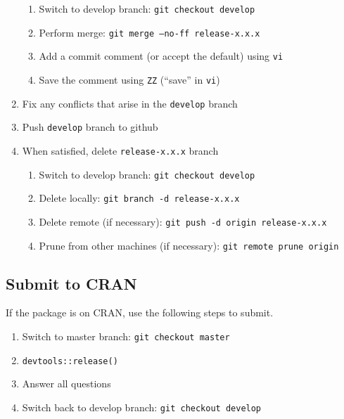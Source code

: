 \documentclass{article}
\begin{document}
\begin{enumerate}
\begin{enumerate}
	\item Switch to develop branch: \texttt{git checkout develop}

    \item Perform merge: \texttt{git merge --no-ff release-x.x.x}
	
	\item Add a commit comment (or accept the default) using \texttt{vi} 
	
	\item Save the comment using \texttt{ZZ} (``save'' in \texttt{vi})

  \end{enumerate}
  \item Fix any conflicts that arise in the \texttt{develop} branch
  
  \item Push \texttt{develop} branch to github
  
  \item When satisfied, delete \texttt{release-x.x.x} branch
  \begin{enumerate}

    \item Switch to develop branch: \texttt{git checkout develop}

    \item Delete locally: \texttt{git branch -d release-x.x.x}

    \item Delete remote (if necessary): \texttt{git push -d origin release-x.x.x} 
	
	\item Prune from other machines (if necessary): \texttt{git remote prune origin} 

  \end{enumerate}
  
\end{enumerate}
  

\subsection{Submit to CRAN} 
\label{sec:submit_to_cran}

If the package is on CRAN, 
use the following steps to submit.

%
\begin{enumerate}

  \item Switch to master branch: \texttt{git checkout master} 

  \item \texttt{devtools::release()}
  
  \item Answer all questions

  \item Switch back to develop branch: \texttt{git checkout develop} 

\end{enumerate}
%
\end{document}
